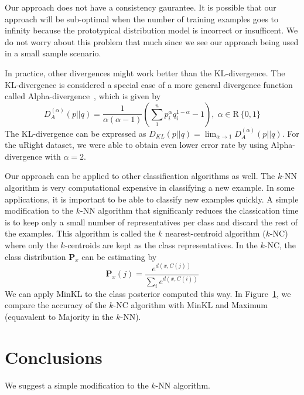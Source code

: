 \documentclass{article}
\begin{document}
Our approach does not have a consistency gaurantee. It is
possible that our approach will be sub-optimal when the number of
training examples goes to infinity because the prototypical
distribution model is incorrect or insufficent. We do not worry
about this problem that much since we see our approach being used
in a small sample scenario.

In practice, other divergences might work better than the
KL-divergence. The KL-divergence is considered a special case of a
more general divergence function called
Alpha-divergence~\cite{Cichocki2010}, which is given by
\[
D^{(\alpha)}_A (p||q) = \frac{1}{\alpha(\alpha - 1)}\left( \sum_1^n
  p^{\alpha}_i q^{1-\alpha}_i - 1\right), \; \alpha \in \mathrm{R} \ \{0,1\}
\]
The KL-divergence can be expressed as $D_{KL} (p || q) = \lim_{\alpha
  \rightarrow 1} D^{(\alpha)}_A (p || q)$.  For the uRight dataset, we
were able to obtain even lower error rate by using Alpha-divergence
with $\alpha = 2$.

Our approach can be applied to other classification algorithms as
well. The $k$-NN algorithm is very computational expensive in
classifying a new example. In some applications, it is important to be
able to classify new examples quickly. A simple modification to the
$k$-NN algorithm that significanly reduces the classication time is to
keep only a small number of representatives per class and discard the
rest of the examples. This algorithm is called the $k$
nearest-centroid algorithm ($k$-NC) where only the $k$-centroids are
kept as the class representatives. In the $k$-NC, the class
distribution $\mathbf{P}_x$ can be estimating by
\[
\mathbf{P}_x(j) = \frac{e^{d(x,C(j))}}{\sum_i e^{d(x, C(i))} }
\]
We can apply MinKL to the class posterior computed this
way. In Figure~\ref{}, we compare the accuracy of the $k$-NC algorithm
with MinKL and Maximum (equavalent to Majority in the $k$-NN).

\section{Conclusions}

We suggest a simple modification to the $k$-NN algorithm.



\end{document}
